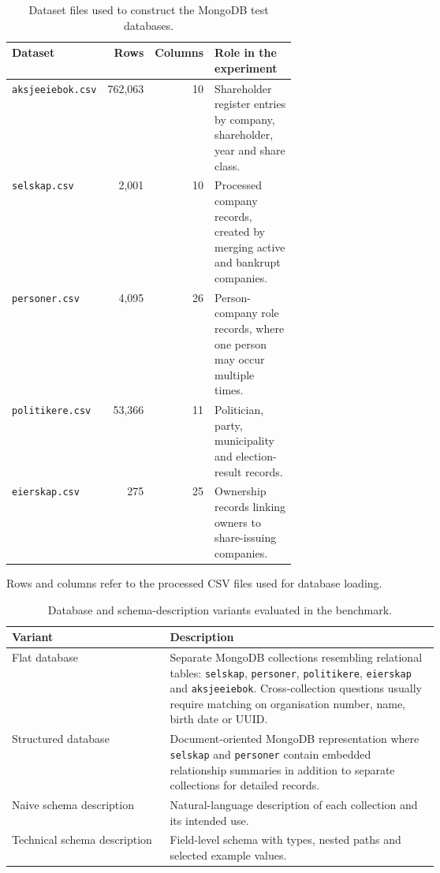 
\begin{table}[htbp]
\centering
\small
\caption{Dataset files used to construct the MongoDB test databases.}
\label{tab:dataset-files-overview}
\begin{tabular}{lrrp{0.42\linewidth}}
\toprule
Dataset & Rows & Columns & Role in the experiment \\
\midrule
\texttt{aksjeeiebok.csv} & 762,063 & 10 & Shareholder register entries by company, shareholder, year and share class. \\
\texttt{selskap.csv} & 2,001 & 10 & Processed company records, created by merging active and bankrupt companies. \\
\texttt{personer.csv} & 4,095 & 26 & Person-company role records, where one person may occur multiple times. \\
\texttt{politikere.csv} & 53,366 & 11 & Politician, party, municipality and election-result records. \\
\texttt{eierskap.csv} & 275 & 25 & Ownership records linking owners to share-issuing companies. \\
\bottomrule
\end{tabular}
\par\footnotesize{Rows and columns refer to the processed CSV files used for database loading.}
\end{table}

\begin{table}[htbp]
\centering
\small
\caption{Database and schema-description variants evaluated in the benchmark.}
\label{tab:schema-variant-overview}
\begin{tabular}{lp{0.63\linewidth}}
\toprule
Variant & Description \\
\midrule
Flat database & Separate MongoDB collections resembling relational tables: \texttt{selskap}, \texttt{personer}, \texttt{politikere}, \texttt{eierskap} and \texttt{aksjeeiebok}. Cross-collection questions usually require matching on organisation number, name, birth date or UUID. \\
Structured database & Document-oriented MongoDB representation where \texttt{selskap} and \texttt{personer} contain embedded relationship summaries in addition to separate collections for detailed records. \\
Naive schema description & Natural-language description of each collection and its intended use. \\
Technical schema description & Field-level schema with types, nested paths and selected example values. \\
\bottomrule
\end{tabular}
\end{table}

